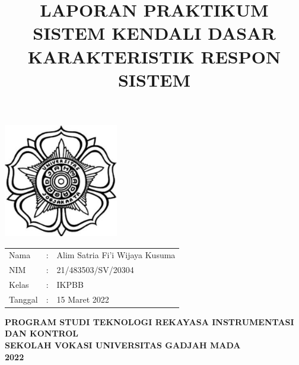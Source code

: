 \documentclass[12 pt]{article}
\title{\large \textbf{LAPORAN PRAKTIKUM SISTEM KENDALI DASAR} \\ \textbf{KARAKTERISTIK RESPON SISTEM}\linebreak}
\author{}
\date{}
\begin{document}
\clearpage
\maketitle
\thispagestyle{empty} %

\begin{center}
\includegraphics[width=5cm,height=5cm]{cover_laporan/logo_ugm.png}
\end{center}

\vspace{1 cm}

\begin{center}
\begin{tabular}{lcl}
Nama & : & Alim Satria Fi'i Wijaya Kusuma \\
NIM & : & 21/483503/SV/20304\\
Kelas & : & IKPBB\\
Tanggal & : & 15 Maret 2022
\end{tabular}
\newline
\newline
\newline
\newline
\newline
\large{\textbf{PROGRAM STUDI TEKNOLOGI REKAYASA INSTRUMENTASI DAN KONTROL}} \\
\textbf{SEKOLAH VOKASI UNIVERSITAS GADJAH MADA} \\
\textbf{2022}
\end{center}

\pagebreak




\end{document}
